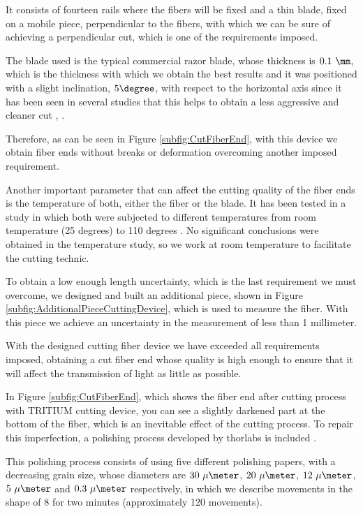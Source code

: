 It consists of fourteen rails where the fibers will be fixed and a thin blade, fixed on a mobile piece, perpendicular to the fibers, with which we can be sure of achieving a perpendicular cut, which is one of the requirements imposed.

The blade used is the typical commercial razor blade, whose thickness is $0.1~\mm$, which is the thickness with which we obtain the best results and it was positioned with a slight inclination, $5\degree$, with respect to the horizontal axis since it has been seen in several studies that this helps to obtain a less aggressive and cleaner cut  \cite{AngleBlade}, \cite{TemperatureBlade}.

Therefore, as can be seen in Figure \ref{subfig:CutFiberEnd}, with this device we obtain fiber ends without breaks or deformation overcoming another imposed requirement.

Another important parameter that can affect the cutting quality of the fiber ends is the temperature of both, either the fiber or the blade. It has been tested in a study in which both were subjected to different temperatures from room temperature (25 degrees) to 110 degrees \cite{TFGAlberto}. No significant conclusions were obtained in the temperature study, so we work at room temperature to facilitate the cutting technic.

To obtain a low enough length uncertainty, which is the last requirement we must overcome, we designed and built an additional piece, shown in Figure \ref{subfig:AdditionalPieceCuttingDevice}, which is used to measure the fiber. With this piece we achieve an uncertainty in the measurement of less than 1 millimeter.

With the designed cutting fiber device we have exceeded all requirements imposed, obtaining a cut fiber end whose quality is high enough to ensure that it will affect the transmission of light as little as possible.

In Figure \ref{subfig:CutFiberEnd}, which shows the fiber end after cutting process with TRITIUM cutting device, you can see a slightly darkened part at the bottom of the fiber, which is an inevitable effect of the cutting process. To repair this imperfection, a polishing process developed by thorlabs is included \cite{DiamondThorlabs}. 

This polishing process consists of using five different polishing papers, with a decreasing grain size, whose diameters are $30~\mu\meter$, $20~\mu\meter$, $12~\mu\meter$, $5~\mu\meter$ and $0.3~\mu\meter$ respectively, in which we describe movements in the shape of 8 for two minutes (approximately 120 movements). 

